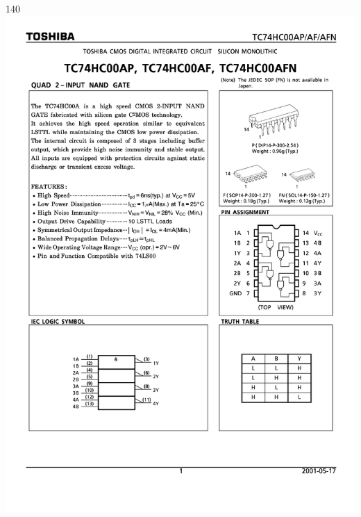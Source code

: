 \documentclass[aspectratio=169]{beamer}
\begin{document}
\begin{frame}[fragile,t]
\begin{textblock}{140}
    \includegraphics[page=3,trim = 0mm 116mm 0mm 0mm,clip,scale=0.37]{pdfs/TC74HC00AP.pdf}
    \end{textblock}
\end{frame}
\end{document}
